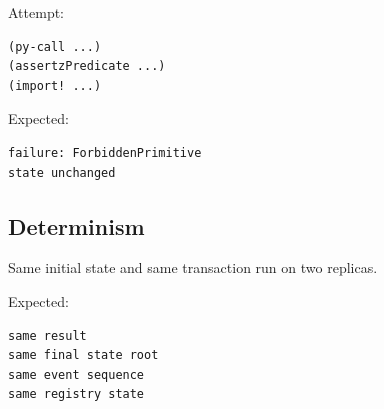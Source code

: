 Attempt:

\begin{lstlisting}
(py-call ...)
(assertzPredicate ...)
(import! ...)
\end{lstlisting}

Expected:

\begin{lstlisting}
failure: ForbiddenPrimitive
state unchanged
\end{lstlisting}

\subsection{Determinism}

Same initial state and same transaction run on two replicas.

Expected:

\begin{lstlisting}
same result
same final state root
same event sequence
same registry state
\end{lstlisting}
